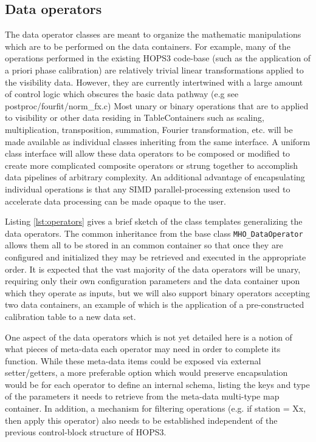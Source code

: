 \documentclass[hidelinks]{article}
\let\Oldsubsection\subsection
\renewcommand{\subsection}{\FloatBarrier\Oldsubsection}
\begin{document}
\subsection{Data operators}

The data operator classes are meant to organize the mathematic manipulations which are to be performed on the data containers. For example, many of the operations performed in the existing HOPS3 code-base (such as the application of a priori phase calibration) are relatively trivial linear transformations applied to the visibility data. However, they are currently intertwined with a large amount of control logic which obscures the basic data pathway (e.g see postproc/fourfit/norm\_fx.c)
Most unary or binary operations that are to applied to visibility or other data residing in TableContainers such as scaling, multiplication, transposition, summation, Fourier transformation, etc. will be made available as individual classes inheriting from the same interface. A uniform class interface will allow these data operators to be composed or modified to create more complicated composite operators or strung together to accomplish data pipelines of arbitrary complexity. An additional advantage of encapsulating individual operations is that any SIMD parallel-processing extension used to accelerate data processing can be made opaque to the user.

Listing \ref{lst:operators} gives a brief sketch of the class templates generalizing the data operators. The common inheritance from the base class \texttt{MHO\_DataOperator} allows them all to be stored in an common container so that once they are configured and initialized they may be retrieved
and executed in the appropriate order. It is expected that the vast majority of the data operators will be unary, requiring only their own configuration 
parameters and the data container upon which they operate as inputs, but we will also support binary operators accepting two data containers, an example
of which is the application of a pre-constructed calibration table to a new data set.

One aspect of the data operators which is not yet detailed here is a notion of what pieces of meta-data each operator may need in order to complete its function.
While these meta-data items could be exposed via external setter/getters, a more preferable option which would preserve encapsulation would be for each operator
to define an internal schema, listing the keys and type of the parameters it needs to retrieve from the meta-data multi-type map container. 
In addition, a mechanism for filtering operations (e.g. if station = Xx, then apply this operator) also needs to be established independent of the
previous control-block structure of HOPS3.
\end{document}
